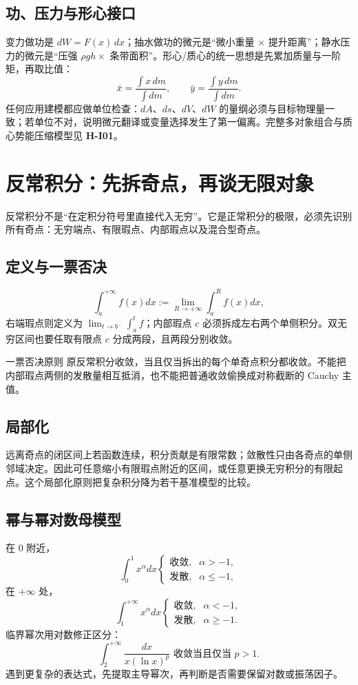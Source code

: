 \documentclass[11pt,a4paper,fontset=fandol]{ctexart}
\newcommand{\kw}[1]{\textbf{\color{deep}#1}}
\begin{document}
\subsection{功、压力与形心接口}

变力做功是 $dW=F(x)\,dx$；抽水做功的微元是“微小重量 $\times$ 提升距离”；静水压力的微元是“压强 $\rho gh\times$ 条带面积”。形心/质心的统一思想是先累加质量与一阶矩，再取比值：
\[
\bar x=\frac{\int x\,dm}{\int dm},
\qquad
\bar y=\frac{\int y\,dm}{\int dm}.
\]
任何应用建模都应做单位检查：$dA$、$ds$、$dV$、$dW$ 的量纲必须与目标物理量一致；若单位不对，说明微元翻译或变量选择发生了第一偏离。完整多对象组合与质心势能压缩模型见 \kw{H-I01}。

\section{反常积分：先拆奇点，再谈无限对象}

反常积分不是“在定积分符号里直接代入无穷”。它是正常积分的极限，必须先识别所有奇点：无穷端点、有限瑕点、内部瑕点以及混合型奇点。

\subsection{定义与一票否决}

\[
\int_a^{+\infty}{f(x)}dx:=\lim_{R\to+\infty}\int_a^R{f(x)}dx,
\]
右端瑕点则定义为 $\lim_{t\to b^-}\int_a^t{f}$；内部瑕点 $c$ 必须拆成左右两个单侧积分。双无穷区间也要任取有限点 $c$ 分成两段，且两段分别收敛。

\begin{warnbox}{一票否决原则}
原反常积分收敛，当且仅当拆出的每个单奇点积分都收敛。不能把内部瑕点两侧的发散量相互抵消，也不能把普通收敛偷换成对称截断的 Cauchy 主值。
\end{warnbox}

\subsection{局部化}

远离奇点的闭区间上若函数连续，积分贡献是有限常数；敛散性只由各奇点的单侧邻域决定。因此可任意缩小有限瑕点附近的区间，或任意更换无穷积分的有限起点。这个局部化原则把复杂积分降为若干基准模型的比较。

\subsection{幂与幂对数母模型}

在 $0$ 附近，
\[
\int_0^1x^\alpha dx
\begin{cases}\text{收敛},&\alpha>-1,\\\text{发散},&\alpha\le-1,\end{cases}
\]
在 $+\infty$ 处，
\[
\int_1^{+\infty}x^\alpha dx
\begin{cases}\text{收敛},&\alpha<-1,\\\text{发散},&\alpha\ge-1.\end{cases}
\]
临界幂次用对数修正区分：
\[
\int_2^{+\infty}\frac{dx}{x{(\ln x)}^p}
\text{ 收敛当且仅当 }p>1.
\]
遇到更复杂的表达式，先提取主导幂次，再判断是否需要保留对数或振荡因子。
\end{document}

